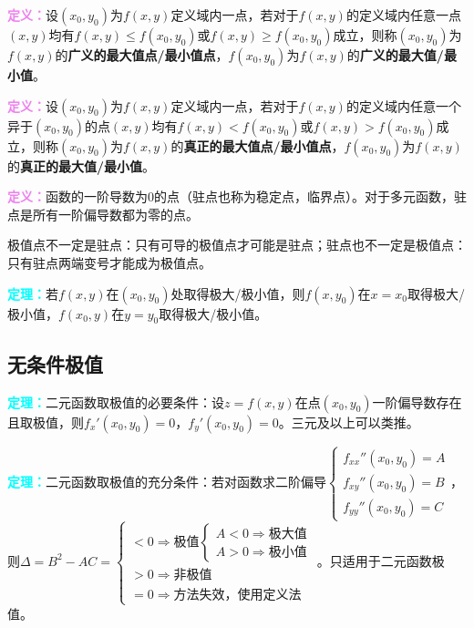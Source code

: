 \textcolor{violet}{\textbf{定义：}}设$(x_0,y_0)$为$f(x,y)$定义域内一点，若对于$f(x,y)$的定义域内任意一点$(x,y)$均有$f(x,y)\leqslant f(x_0,y_0)$或$f(x,y)\geqslant f(x_0,y_0)$成立，则称$(x_0,y_0)$为$f(x,y)$的\textbf{广义的最大值点/最小值点}，$f(x_0,y_0)$为$f(x,y)$的\textbf{广义的最大值/最小值}。

\textcolor{violet}{\textbf{定义：}}设$(x_0,y_0)$为$f(x,y)$定义域内一点，若对于$f(x,y)$的定义域内任意一个异于$(x_0,y_0)$的点$(x,y)$均有$f(x,y)<f(x_0,y_0)$或$f(x,y)>f(x_0,y_0)$成立，则称$(x_0,y_0)$为$f(x,y)$的\textbf{真正的最大值点/最小值点}，$f(x_0,y_0)$为$f(x,y)$的\textbf{真正的最大值/最小值}。

\textcolor{violet}{\textbf{定义：}}函数的一阶导数为0的点（驻点也称为稳定点，临界点）。对于多元函数，驻点是所有一阶偏导数都为零的点。

极值点不一定是驻点：只有可导的极值点才可能是驻点；驻点也不一定是极值点：只有驻点两端变号才能成为极值点。

\textcolor{aqua}{\textbf{定理：}}若$f(x,y)$在$(x_0,y_0)$处取得极大/极小值，则$f(x,y_0)$在$x=x_0$取得极大/极小值，$f(x_0,y)$在$y=y_0$取得极大/极小值。

\subsection{无条件极值}

\textcolor{aqua}{\textbf{定理：}}二元函数取极值的必要条件：设$z=f(x,y)$在点$(x_0,y_0)$一阶偏导数存在且取极值，则$f_x'(x_0,y_0)=0$，$f_y'(x_0,y_0)=0$。三元及以上可以类推。

\textcolor{aqua}{\textbf{定理：}}二元函数取极值的充分条件：若对函数求二阶偏导$\left\{\begin{array}{l}
    f_{xx}''(x_0,y_0)=A \\
    f_{xy}''(x_0,y_0)=B \\
    f_{yy}''(x_0,y_0)=C
\end{array}\right.$，则$\Delta=B^2-AC=\left\{\begin{array}{l}
    <0\Rightarrow\text{极值}\left\{\begin{array}{l}
        A<0\Rightarrow\text{极大值} \\
        A>0\Rightarrow\text{极小值}
    \end{array}\right. \\
    >0\Rightarrow\text{非极值} \\
    =0\Rightarrow\text{方法失效，使用定义法}
\end{array}\right.$。只适用于二元函数极值。

